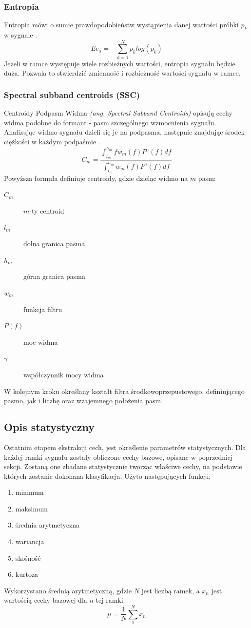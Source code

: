 \documentclass[a4paper,12pt,twoside,openany]{report}
\newcommand{\ang}[1]{\textit{(ang. #1)}}
\begin{document}
\subsubsection{Entropia}
Entropia mówi o sumie prawdopodobieństw wystąpienia danej wartości próbki $p_k$ w sygnale \cite{Majstorovic2011}.
\begin{equation}
	Ee_{s}=-\sum _{k=1}^{N}p_k log(p_k)
	\label{eq:entropy}
\end{equation}
Jeżeli w ramce występuje wiele rozbieżnych wartości, entropia sygnału będzie duża. 
Pozwala to stwierdzić zmienność i rozbieżność wartości sygnału w ramce.
\subsubsection{Spectral subband centroids (SSC)}
Centroidy Podpasm Widma \ang{Spectral Subband Centroids} opisują cechy widma podobne do formant - pasm szczególnego wzmocnienia sygnału.
Analizując widmo sygnału dzieli się je na podpasma, następnie znajdując środek ciężkości w każdym podpaśmie \cite{Majstorovic2011}.
\begin{equation}
	C_m=\frac
	{\int_{l_m}^{h_m} f w_m(f) P^\gamma(f)df}
	{\int_{l_m}^{h_m} w_m(f) P^\gamma(f)df}
	\label{eq:ssc}
\end{equation}
Powyższa formuła definiuje centroidy, gdzie dzieląc widmo na $m$ pasm:
\begin{description}
	\item[$C_m$] $m$-ty centroid
	\item[$l_m$] dolna granica pasma
	\item[$h_m$] górna granica pasma
	\item[$w_m$] funkcja filtru
	\item[$P(f)$] moc widma
	\item[$\gamma$] współczynnik mocy widma
\end{description}
W kolejnym kroku określany kształt filtra środkowoprzepustowego, definiującego pasmo, 
jak i liczbę oraz wzajemnego położenia pasm.
\subsection{Opis statystyczny}
Ostatnim etapem ekstrakcji cech, jest określenie parametrów statystycznych.
Dla każdej ramki sygnału zostały obliczone cechy bazowe, opisane w poprzedniej sekcji.
Zostaną one zbadane statystycznie tworząc właściwe cechy, na podstawie których zostanie dokonana klasyfikacja.
Użyto następujących funkcji:
\begin{enumerate}
	\item minimum 
	\item maksimum 
	\item średnia arytmetyczna
	\item wariancja 
	\item skośność
	\item kurtoza
\end{enumerate}
Wykorzystano średnią arytmetyczną, gdzie $N$ jest liczbą ramek, a $x_n$ jest wartością cechy bazowej dla $n$-tej ramki.
\begin{equation}
	\mu = \frac{1}{N}\sum_1^Nx_n
\end{equation}
\end{document}
